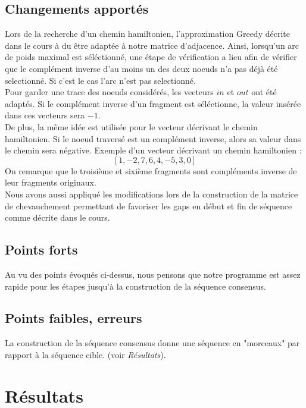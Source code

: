 \documentclass[11pt]{article}
\begin{document}
\subsection*{Changements apportés}
Lors de la recherche d'un chemin hamiltonien, l'approximation Greedy décrite dans le cours à du être adaptée à notre matrice d'adjacence. Ainsi, lorsqu'un arc de poids maximal est séléctionné, une étape de vérification a lieu afin de vérifier que le complément inverse d'au moins un des deux noeuds n'a pas déjà été selectionné. Si c'est le cas l'arc n'est pas selectionné.\\
Pour garder une trace des noeuds considérés, les vecteurs $in$ et $out$ ont été adaptés. Si le complément inverse d'un fragment est séléctionne, la valeur insérée dans ces vecteurs sera $-1$.\\
De plus, la même idée est utilisée pour le vecteur décrivant le chemin hamiltonien. Si le noeud traversé est un complément inverse, alors sa valeur dans le chemin sera négative. Exemple d'un vecteur décrivant un chemin hamiltonien :
$$[1, -2, 7, 6, 4, -5, 3, 0]$$
On remarque que le troisième et sixième fragments sont compléments inverse de leur fragments originaux.\\[.5cm]
Nous avons aussi appliqué les modifications lors de la construction de la matrice de chevauchement permettant de favoriser les gaps en début et fin de séquence comme décrite dans le cours.
\subsection*{Points forts}
Au vu des points évoqués ci-dessus, nous pensons que notre programme est assez rapide pour les étapes jusqu'à la construction de la séquence consensus.
\subsection*{Points faibles, erreurs}
La construction de la séquence consensus donne une séquence en "morceaux" par rapport à la séquence cible. (voir \emph{Résultats}). 
\section{Résultats}
\end{document}
